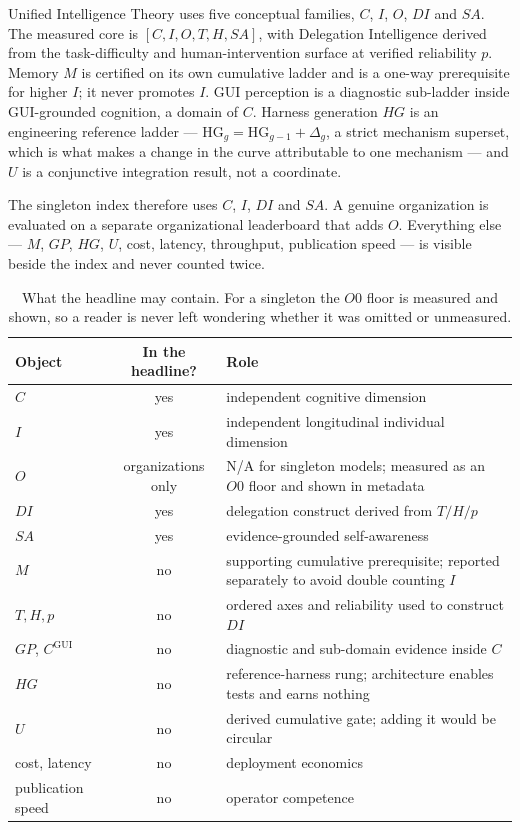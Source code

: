 \documentclass[11pt]{article}
\theoremstyle{definition}
\begin{document}
Unified Intelligence Theory uses five conceptual families, $C$, $I$, $O$, $DI$ and $SA$. The measured core is $[C, I, O, T, H, SA]$, with Delegation Intelligence derived from the task-difficulty and human-intervention surface at verified reliability $p$. Memory $M$ is certified on its own cumulative ladder and is a one-way prerequisite for higher $I$; it never promotes $I$. GUI perception is a diagnostic sub-ladder inside GUI-grounded cognition, a domain of $C$. Harness generation $HG$ is an engineering reference ladder --- $\mathrm{HG}_g = \mathrm{HG}_{g-1} + \Delta_g$, a strict mechanism superset, which is what makes a change in the curve attributable to one mechanism --- and $U$ is a conjunctive integration result, not a coordinate.

The singleton index therefore uses $C$, $I$, $DI$ and $SA$. A genuine organization is evaluated on a separate organizational leaderboard that adds $O$. Everything else --- $M$, $GP$, $HG$, $U$, cost, latency, throughput, publication speed --- is visible beside the index and never counted twice.

\begin{table}[!htbp]
\centering\small
\begin{tabularx}{\textwidth}{@{}l c Y@{}}
\toprule
Object & In the headline? & Role \\
\midrule
$C$ & yes & independent cognitive dimension \\
$I$ & yes & independent longitudinal individual dimension \\
$O$ & organizations only & N/A for singleton models; measured as an $O0$ floor and shown in metadata \\
$DI$ & yes & delegation construct derived from $T/H/p$ \\
$SA$ & yes & evidence-grounded self-awareness \\
$M$ & no & supporting cumulative prerequisite; reported separately to avoid double counting $I$ \\
$T, H, p$ & no & ordered axes and reliability used to construct $DI$ \\
$GP$, $C^{\mathrm{GUI}}$ & no & diagnostic and sub-domain evidence inside $C$ \\
$HG$ & no & reference-harness rung; architecture enables tests and earns nothing \\
$U$ & no & derived cumulative gate; adding it would be circular \\
cost, latency & no & deployment economics \\
publication speed & no & operator competence \\
\bottomrule
\end{tabularx}
\caption{What the headline may contain. For a singleton the $O0$ floor is measured and shown, so a reader is never left wondering whether it was omitted or unmeasured.}
\label{tab:objects}
\end{table}
\end{document}

